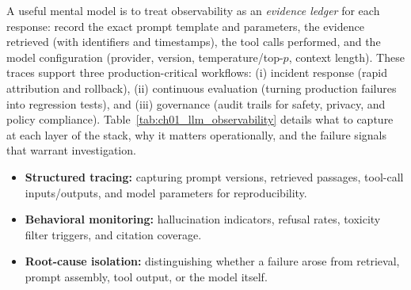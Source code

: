 A useful mental model is to treat observability as an \emph{evidence ledger} for each response: record the exact prompt template and parameters, the evidence retrieved (with identifiers and timestamps), the tool calls performed, and the model configuration (provider, version, temperature/top-$p$, context length). These traces support three production-critical workflows: (i) incident response (rapid attribution and rollback), (ii) continuous evaluation (turning production failures into regression tests), and (iii) governance (audit trails for safety, privacy, and policy compliance). Table~\ref{tab:ch01_llm_observability} details what to capture at each layer of the stack, why it matters operationally, and the failure signals that warrant investigation.

\begin{tcolorbox}[
  title={\textbf{Effective LLM observability includes:}},
  colback=blue!5,
  colframe=blue!40!black,
  colbacktitle=blue!20,
  coltitle=black,
  fonttitle=\bfseries,
  boxrule=0.7pt,
  arc=4pt,
  left=5mm, right=5mm, top=4mm, bottom=4mm,
  before skip=6pt,
  after skip=6pt
]
\begin{itemize}[leftmargin=1.5em, itemsep=2pt]
  \item \textbf{Structured tracing:} capturing prompt versions, retrieved passages, tool-call inputs/outputs, and model parameters for reproducibility.
  \item \textbf{Behavioral monitoring:} hallucination indicators, refusal rates, toxicity filter triggers, and citation coverage.
  \item \textbf{Root-cause isolation:} distinguishing whether a failure arose from retrieval, prompt assembly, tool output, or the model itself.
\end{itemize}
\end{tcolorbox}

